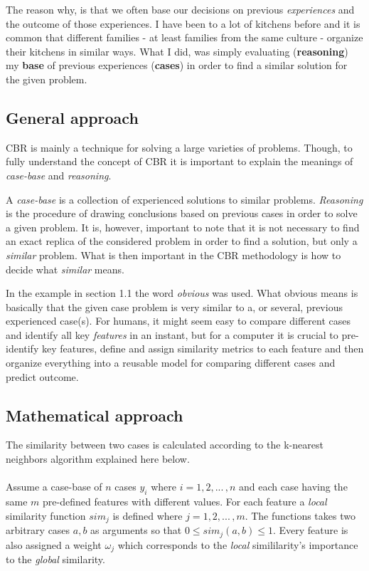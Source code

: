 \documentclass[12pt]{article}
\begin{document}
The reason why, is that we often base our decisions on previous \textit{experiences} and the outcome of those experiences. I have been to a lot of kitchens before and it is common that different families - at least families from the same culture - organize their kitchens in similar ways. What I did, was simply evaluating (\textbf{reasoning}) my \textbf{base} of previous experiences (\textbf{cases}) in order to find a similar solution for the given problem. 

\subsection{General approach}

CBR is mainly a technique for solving a large varieties of problems. Though, to fully understand the concept of CBR it is important to explain the meanings of \textit{case-base} and \textit{reasoning}.

A \textit{case-base} is a collection of experienced solutions to similar problems. \textit{Reasoning} is the procedure of drawing conclusions based on previous cases in order to solve a given problem. It is, however, important to note that it is not necessary to find an exact replica of the considered problem in order to find a solution, but only a \textit{similar} problem. What is then important in the CBR methodology is how to decide what \textit{similar} means. 

In the example in section 1.1 the word \textit{obvious} was used. What obvious means is basically that the given case problem is very similar to a, or several, previous experienced case(s). For humans, it might seem easy to compare different cases and identify all key \textit{features} in an instant, but for a computer it is crucial to pre-identify key features, define and assign similarity metrics to each feature and then organize everything into a reusable model for comparing different cases and predict outcome. 

\subsection{Mathematical approach}

The similarity between two cases is calculated according to the k-nearest neighbors algorithm explained here below. \\\\
Assume a case-base of $n$ cases $y_i$ where $i=1,2,...\,,n$ and each case having the same $m$ pre-defined features with different values. For each feature a \textit{local} similarity function $sim_j$ is defined where $j=1,2,...\,,m$. The functions takes two arbitrary cases $a,b$ as arguments so that $0 \leq sim_j(a,b) \leq 1$. Every feature is also assigned a weight $\omega_j$ which corresponds to the \textit{local} simililarity's importance to the \textit{global} similarity. 
\end{document}
